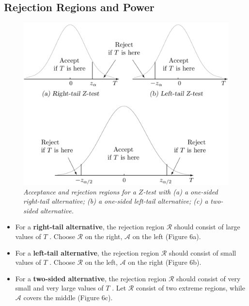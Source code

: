 \subsection{Rejection Regions and Power}
\label{subsec:rejection-region-and-power}

\begin{figure}[H]
  \centering
  \includegraphics[width=\linewidth]{img/fig-9.7.png}
  \caption{\textit{Acceptance and rejection regions for a $Z$-test with (a) a one-sided right-tail alternative; (b) a one-sided left-tail alternative; (c) a two-sided alternative.}}
  \label{fig:9.7}
\end{figure}

\begin{itemize}[leftmargin=.6cm]
  \item For a \textbf{right-tail alternative}, the rejection region $\mathcal{R}$ should consist of large values of $T$ . Choose $\mathcal{R}$ on the right, $\mathcal{A}$ on the left (Figure 6a).
  \item For a \textbf{left-tail alternative}, the rejection region $\mathcal{R}$ should consist of small values of $T$ . Choose $\mathcal{R}$ on the left, $\mathcal{A}$ on the right (Figure 6b).
  \item For a \textbf{two-sided alternative}, the rejection region $\mathcal{R}$ should consist of very small and very large values of $T$ . Let $\mathcal{R}$ consist of two extreme regions, while $\mathcal{A}$ covers the middle (Figure 6c).
\end{itemize}
